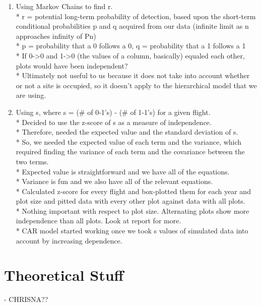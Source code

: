 \documentclass{article}
\begin{document}
	\begin{enumerate}
    	\item Using Markov Chains to find r. \\
          * r = potential long-term probability of detection, based upon the 
			short-term conditional probabilities p and q acquired from our data 
			(infinite limit as n approaches infinity of Pn) \\
          * p = probability that a 0 follows a 0, q = probability that a 1 follows
			 a 1  \\
          * If 0->0 and 1->0 (the values of a column, basically) equaled each 
			other, plots would have been independent?  \\
          * Ultimately not useful to us because it does not take into account 
			whether or not a site is occupied, so it doesn't apply to the 
			hierarchical model that we are using. \\
   		\item Using s, where s = (\# of 0-1's) - (\# of 1-1's) for a given flight.\\
          * Decided to use the z-score of s as a measure of independence.  \\
          * Therefore, needed the expected value and the standard deviation of s. \\
          * So, we needed the expected value of each term and the variance, which 
			required finding the variance of each term and the covariance between 
			the two terms. \\
          * Expected value is straightforward and we have all of the equations. \\
          * Variance is fun and we also have all of the relevant equations. \\
          * Calculated z-score for every flight and box-plotted them for each year
			and plot size and pitted data with every other plot against data with
			all plots. \\
          * Nothing important with respect to plot size. Alternating plots show 
			more independence than all plots. Look at report for more. \\
          * CAR model started working once we took s values of simulated data into
			account by increasing dependence.  \\
	\end{enumerate}

\section{Theoretical Stuff} - CHRISNA??
\end{document}
